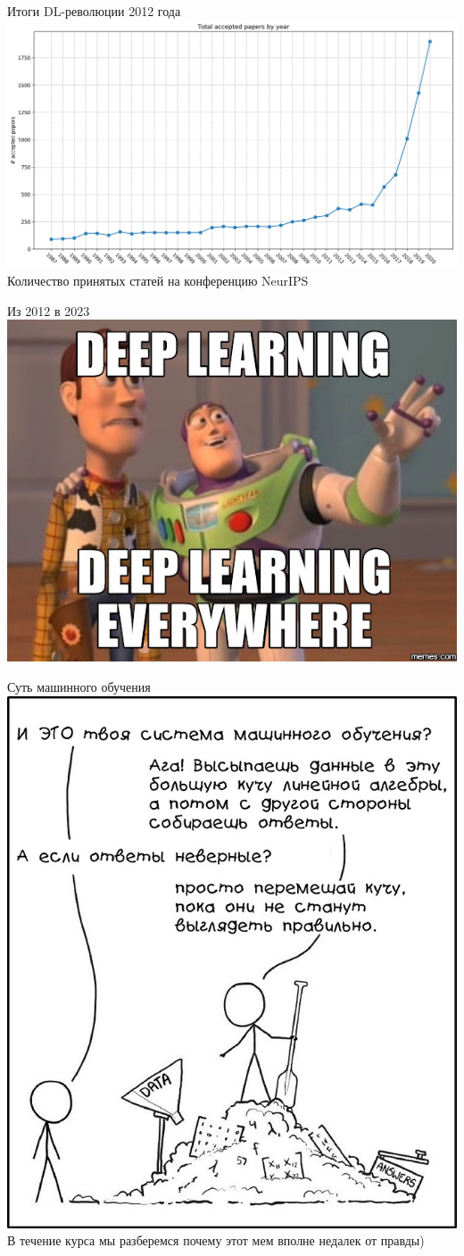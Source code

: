 \documentclass[aspectratio=169, professionalfonts]{beamer}
\begin{document}
\begin{frame}{Итоги DL-революции 2012 года}
    \centering
    \includegraphics[width=.8\linewidth]{figures/fig61-nips.jpg} \\
    Количество принятых статей на конференцию NeurIPS
\end{frame}

\begin{frame}{Из 2012 в 2023}
    \centering
    \includegraphics[width=.6\linewidth]{figures/fig62-dl-everywhere.jpg}
\end{frame}

\begin{frame}{Суть машинного обучения}
    \centering
    \includegraphics[width=.35\linewidth]{figures/fig63-ml-core.jpg} \\
    В течение курса мы разберемся почему этот мем вполне недалек от правды)
\end{frame}
\end{document}
